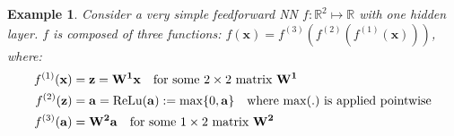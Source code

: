 \documentclass[11pt, a4paper, bibliography=totoc]{report}
\newcommand{\reals}{\mathbb{R}}
\newcommand{\x}{\mathbf{x}}
\newtheorem{example}{Example}
\begin{document}
\begin{example} \label{eg:nn}
Consider a very simple feedforward NN $ f : \reals^2 \mapsto \reals $ with one hidden layer. $ f $ is composed of three functions: $ f(\x) = f^{(3)}(f^{(2)}(f^{(1)}(\x))) $, where:
\begin{align*}
	f^{(1)}(\x) &= \mathbf{z} = \mathbf{W^1}\x \quad \text{for some $ 2\times 2 $ matrix $ \mathbf{W^1} $} \\
	f^{(2)}(\mathbf{z}) &= \mathbf{a} = \textup{ReLu}(\mathbf{a}) := \max\{0,\mathbf{a} \} \quad \text{where $ \max(.) $ is applied pointwise} \\
	f^{(3)}(\mathbf{a}) &= \mathbf{W^2}\mathbf{a} \quad \text{for some $ 1 \times 2 $ matrix $ \mathbf{W^2} $}
\end{align*}
\end{example}
\end{document}

